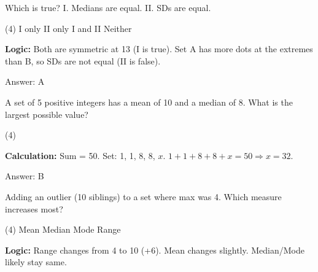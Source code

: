 \documentclass[11pt,paper=a4,answers]{exam}
\begin{document}
\begin{questions}
\vspace{60pt}

 Which is true? I. Medians are equal. II. SDs are equal.
\begin{tasks}(4)
    \task I only
    \task II only
    \task I and II
    \task Neither
\end{tasks}

\begin{solution}
\textbf{Logic:} Both are symmetric at 13 (I is true). Set A has more dots at the extremes than B, so SDs are not equal (II is false).

\vspace{30pt}

Answer: \colorbox{yellow!100}{A}
\end{solution}

\vspace{60pt}

\question
A set of 5 positive integers has a mean of 10 and a median of 8. What is the largest possible value?
\begin{tasks}(4)
\end{tasks}

\begin{solution}
\textbf{Calculation:} Sum = 50. Set: 1, 1, 8, 8, $x$. $1+1+8+8+x=50 \Rightarrow x=32$.

\vspace{30pt}

Answer: \colorbox{yellow!100}{B}
\end{solution}

\vspace{60pt}

\question
Adding an outlier (10 siblings) to a set where max was 4. Which measure increases most?
\begin{tasks}(4)
    \task Mean
    \task Median
    \task Mode
    \task Range
\end{tasks}

\begin{solution}
\textbf{Logic:} Range changes from 4 to 10 (+6). Mean changes slightly. Median/Mode likely stay same.

\vspace{30pt}


\end{solution}
\end{questions}
\end{document}

